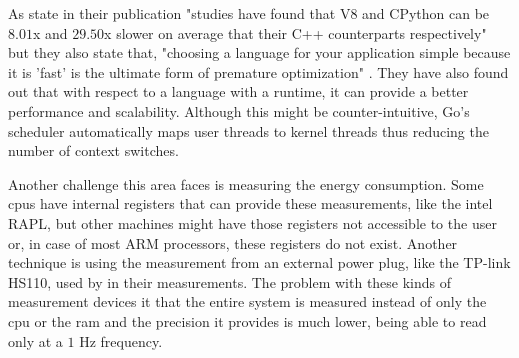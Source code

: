 As \textcite{usenix-comparing-29x} state in their publication "studies have found that \gls{V8} and \gls{CPython} can be $8.01$x and $29.50$x slower on average that their C++ counterparts respectively" but they also state that, "choosing a language for your application simple because it is 'fast' is the ultimate form of premature optimization" \cite{python-is-slow}. They have also found out that with respect to a language with a runtime, it can provide a better performance and scalability. Although this might be counter-intuitive, Go's scheduler automatically maps user threads to kernel threads thus reducing the number of context switches.

Another challenge this area faces is measuring the energy consumption. Some \glspl{cpu} have internal registers that can provide these measurements, like the intel \gls{RAPL}, but other machines might have those registers not accessible to the user or, in case of most \gls{ARM} processors, these registers do not exist. Another technique is using the measurement from an external power plug, like the TP-link HS110, used by \textcite{meassuring-jit} in their measurements. The problem with these kinds of measurement devices it that the entire system is measured instead of only the \gls{cpu} or the \gls{ram} and the precision it provides is much lower, being able to read only at a $1$ Hz frequency. 

